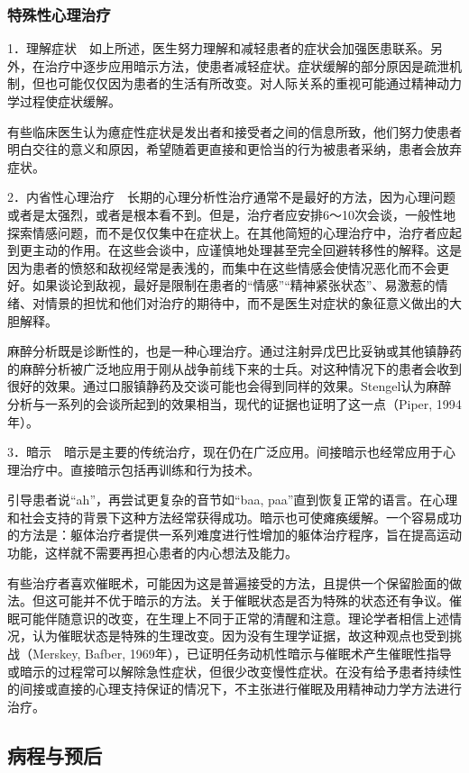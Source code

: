 \subsubsection{特殊性心理治疗}

1．理解症状　如上所述，医生努力理解和减轻患者的症状会加强医患联系。另外，在治疗中逐步应用暗示方法，使患者减轻症状。症状缓解的部分原因是疏泄机制，但也可能仅仅因为患者的生活有所改变。对人际关系的重视可能通过精神动力学过程使症状缓解。

有些临床医生认为癔症性症状是发出者和接受者之间的信息所致，他们努力使患者明白交往的意义和原因，希望随着更直接和更恰当的行为被患者采纳，患者会放弃症状。

2．内省性心理治疗　长期的心理分析性治疗通常不是最好的方法，因为心理问题或者是太强烈，或者是根本看不到。但是，治疗者应安排6～10次会谈，一般性地探索情感问题，而不是仅仅集中在症状上。在其他简短的心理治疗中，治疗者应起到更主动的作用。在这些会谈中，应谨慎地处理甚至完全回避转移性的解释。这是因为患者的愤怒和敌视经常是表浅的，而集中在这些情感会使情况恶化而不会更好。如果谈论到敌视，最好是限制在患者的“情感”“精神紧张状态”、易激惹的情绪、对情景的担忧和他们对治疗的期待中，而不是医生对症状的象征意义做出的大胆解释。

麻醉分析既是诊断性的，也是一种心理治疗。通过注射异戊巴比妥钠或其他镇静药的麻醉分析被广泛地应用于刚从战争前线下来的士兵。对这种情况下的患者会收到很好的效果。通过口服镇静药及交谈可能也会得到同样的效果。Stengel认为麻醉分析与一系列的会谈所起到的效果相当，现代的证据也证明了这一点（Piper,
1994年）。

3．暗示　暗示是主要的传统治疗，现在仍在广泛应用。间接暗示也经常应用于心理治疗中。直接暗示包括再训练和行为技术。

引导患者说“ah”，再尝试更复杂的音节如“baa,
paa”直到恢复正常的语言。在心理和社会支持的背景下这种方法经常获得成功。暗示也可使瘫痪缓解。一个容易成功的方法是：躯体治疗者提供一系列难度进行性增加的躯体治疗程序，旨在提高运动功能，这样就不需要再担心患者的内心想法及能力。

有些治疗者喜欢催眠术，可能因为这是普遍接受的方法，且提供一个保留脸面的做法。但这可能并不优于暗示的方法。关于催眠状态是否为特殊的状态还有争议。催眠可能伴随意识的改变，在生理上不同于正常的清醒和注意。理论学者相信上述情况，认为催眠状态是特殊的生理改变。因为没有生理学证据，故这种观点也受到挑战（Merskey,
Bafber,
1969年），已证明任务动机性暗示与催眠术产生催眠性指导或暗示的过程常可以解除急性症状，但很少改变慢性症状。在没有给予患者持续性的间接或直接的心理支持保证的情况下，不主张进行催眠及用精神动力学方法进行治疗。

\subsection{病程与预后}

